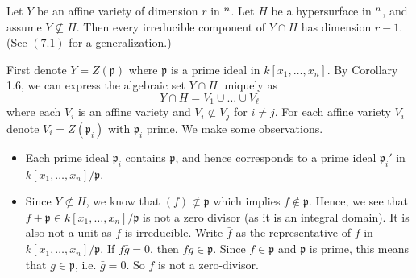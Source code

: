 \documentclass{/Users/SHER/Documents/Hartshorne-Exercises/hw_pset} %
\let\aa\relax
\DeclareMathOperator{\aa}{\mathbf{A}} %
\newcommand{\x}{x_1, \dots, x_n}    %
\newcommand{\idl}[1]{\mathfrak{#1}} %
\newcommand{\lfy}[1]{{\color{Maroon} #1}}
\begin{document}
\begin{exercise}[1.8]
    Let $Y$ be an affine variety of dimension $r$ in $\aa^n$.
    Let $H$ be a hypersurface in $\aa^n$, and assume $Y \not\subseteq H$.
    Then every irreducible component of $Y \cap H$ has dimension $r-1$.
    (See $(7.1)$ for a generalization.)
\end{exercise}

\begin{solution}
    First denote $Y = Z(\idl{p})$ where $\idl{p}$ is a prime ideal in $k[\x]$.
    By Corollary 1.6, we can express the algebraic set $Y \cap H$ uniquely as 
    \[
        Y \cap H = V_1 \cup \dots \cup V_{\ell}
    \]
    where each $V_i$ is an affine variety and $V_i \not\subset V_j$ for $i \ne j$. 
    For each affine variety $V_i$ denote $V_i = Z(\idl{p}_i)$ with $\idl{p}_i$ prime. 
    We make some observations. 
    \begin{itemize}
        \item Each prime ideal $\idl{p}_i$ contains $\idl{p}$, and hence corresponds to a 
        prime ideal $\idl{p}_i'$ in $k[\x]/\idl{p}$.

        \item 
        Since $Y \not\subset H$, we know that $(f) \not\subset \idl{p}$ which implies 
        $f \not\in \idl{p}$. Hence, we see that $f + \idl{p} \in k[\x]/\idl{p}$ 
        is not a zero divisor (as it is an integral domain). It is also not a unit as 
        $f$ is irreducible. \lfy{Write $\bar{f}$ as the representative of $f$ in $k[\x]/\idl{p}$. If $\bar{f}\bar{g} = \bar{0}$, then $fg \in \idl{p}$. Since $f \in \idl{p}$ and $\idl{p}$ is prime, this means that $g \in \idl{p}$, i.e. $\bar{g} = \bar{0}$. So $\bar{f}$ is not a zero-divisor.}


\end{itemize}
\end{solution}
\end{document}
